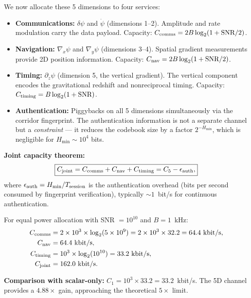 \documentclass[aps,prd,twocolumn,superscriptaddress,nofootinbib]{revtex4-2}
\begin{document}
We now allocate these 5 dimensions to four services:

\begin{itemize}
\item \textbf{Communications:} $\delta\psi$ and $\dot\psi$ (dimensions 1--2).
Amplitude and rate modulation carry the data payload.
Capacity: $C_{\rm comms} = 2B\log_2(1 + \text{SNR}/2)$.

\item \textbf{Navigation:} $\nabla_x\psi$ and $\nabla_y\psi$ (dimensions 3--4).
Spatial gradient measurements provide 2D position information.
Capacity: $C_{\rm nav} = 2B\log_2(1 + \text{SNR}/2)$.

\item \textbf{Timing:} $\partial_z\psi$ (dimension 5, the vertical gradient).
The vertical component encodes the gravitational redshift and
nonreciprocal timing.
Capacity: $C_{\rm timing} = B\log_2(1 + \text{SNR})$.

\item \textbf{Authentication:} Piggybacks on all 5 dimensions simultaneously
via the corridor fingerprint.  The authentication information is not a
separate channel but a \emph{constraint} --- it reduces the codebook
size by a factor $2^{-H_{\min}}$, which is negligible for
$H_{\min} \sim 10^4$ bits.
\end{itemize}

\textbf{Joint capacity theorem:}
\begin{equation}
\boxed{
C_{\rm joint} = C_{\rm comms} + C_{\rm nav} + C_{\rm timing}
= C_5 - \epsilon_{\rm auth},
}
\end{equation}
where $\epsilon_{\rm auth} = H_{\min}/T_{\rm session}$ is the
authentication overhead (bits per second consumed by fingerprint
verification), typically $\sim 1$~bit/s for continuous authentication.

For equal power allocation with SNR $= 10^{10}$ and $B = 1$~kHz:
\begin{align}
C_{\rm comms} &= 2\times10^3\times\log_2(5\times10^9)
= 2\times10^3\times32.2 = 64.4~\text{kbit/s}, \\
C_{\rm nav} &= 64.4~\text{kbit/s}, \\
C_{\rm timing} &= 10^3\times\log_2(10^{10})
= 33.2~\text{kbit/s}, \\
C_{\rm joint} &= 162.0~\text{kbit/s}.
\end{align}

\textbf{Comparison with scalar-only:}
$C_1 = 10^3\times33.2 = 33.2$~kbit/s.  The 5D channel provides a
$4.88\times$ gain, approaching the theoretical $5\times$ limit.
\end{document}
